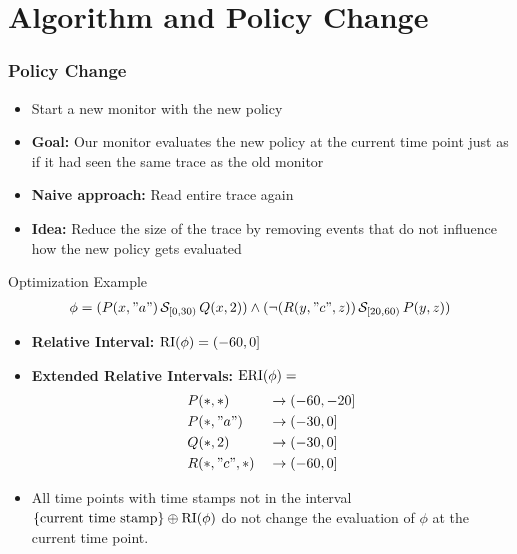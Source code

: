\section{Algorithm and Policy Change}


\begin{frame}
    \frametitle{Policy Change}
    \begin{itemize}
        \item Start a new monitor with the new policy
        \item \textbf{Goal:} Our monitor evaluates the new policy at the current time point just as if it had seen the same trace as the old monitor
        \item \textbf{Naive approach:} Read entire trace again
        \item \textbf{Idea:} Reduce the size of the trace by removing events that do not influence how the new policy gets evaluated
    \end{itemize}
\end{frame}

\begin{frame}{Optimization Example}
    \vspace{-1cm}
    \begin{align*}
        \phi = 
        (P(x, "a") \,\mathcal{S}_{[0,30)}\, Q(x, 2))
        \land 
        (\neg (R(y, "c", z)) \,\mathcal{S}_{[20,60)}\, P(y, z))
    \end{align*}

    \begin{itemize}
        \item \textbf{Relative Interval:} $\operatorname{RI}(\phi) = (-60,0]$
        \item \textbf{Extended Relative Intervals:} $\operatorname{ERI}(\phi) =$
        \begin{alignat*}{3}
            &P(*,*)      &&\to (-60,-20]\\
            &P(*,"a")    &&\to (-30,0]\\
            &Q(*,2)      &&\to (-30,0]\\
            &R(*,"c",*)  &&\to (-60,0]
        \end{alignat*}
        \item All time points with time stamps not in the interval
            $\{\text{current time stamp}\} \oplus \operatorname{RI}(\phi)$
        do not change the evaluation of $\phi$ at the current time point.
    \end{itemize}


\end{frame}

